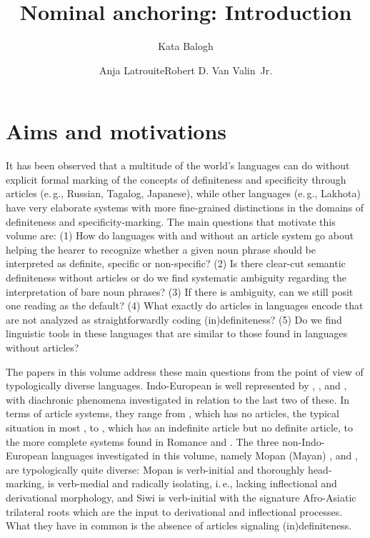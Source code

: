 \documentclass[output=paper]{langsci/langscibook}
\author{Kata Balogh\affiliation{Heinrich-Heine-Universität Düsseldorf}\and Anja Latrouite\affiliation{Heinrich-Heine-Universität Düsseldorf}\lastand  Robert D. Van Valin\quotesinglbase\ Jr.\affiliation{Heinrich-Heine-Universität Düsseldorf \& University at Buffalo}}
\title{Nominal anchoring: Introduction}
\begin{document}
\maketitle

\section{Aims and motivations}\label{sec:intro:1}
It has been observed that a multitude of the world's languages can do without explicit formal marking of the concepts of definiteness and specificity through articles (e.\,g., Russian, Tagalog, Japanese), while other languages (e.\,g., Lakhota) have very elaborate systems with more fine-grained distinctions in the domains of definiteness and specificity-marking. The main questions that motivate this volume are: (1) How do languages with and without an article system go about helping the hearer to recognize whether a given noun phrase should be interpreted as definite, specific or non-specific? (2) Is there clear-cut semantic definiteness without articles or do we find systematic ambiguity regarding the interpretation of bare noun phrases? (3) If there is ambiguity, can we still posit one reading as the default? (4) What exactly do articles in languages encode that are not analyzed as straightforwardly coding (in)definiteness? (5) Do we find linguistic tools in these languages that are similar to those found in languages without articles?

The papers in this volume address these main questions from the point of view of typologically diverse languages. Indo-European is well represented by , ,  and , with diachronic phenomena investigated in relation to the last two of these.  In terms of article systems, they range from , which has no articles, the typical situation in most , to , which has an indefinite article but no definite article, to the more complete systems found in Romance  and . The three non-Indo-European languages investigated in this volume, namely Mopan (Mayan) ,  and , are typologically quite diverse: Mopan  is verb-initial and thoroughly head-marking,  is verb-medial and radically isolating, i.\,e., lacking inflectional and derivational morphology, and Siwi  is verb-initial with the signature Afro-Asiatic  trilateral roots which are the input to derivational and inflectional processes. What they have in common is the absence of articles signaling (in)definiteness. 
\end{document}
